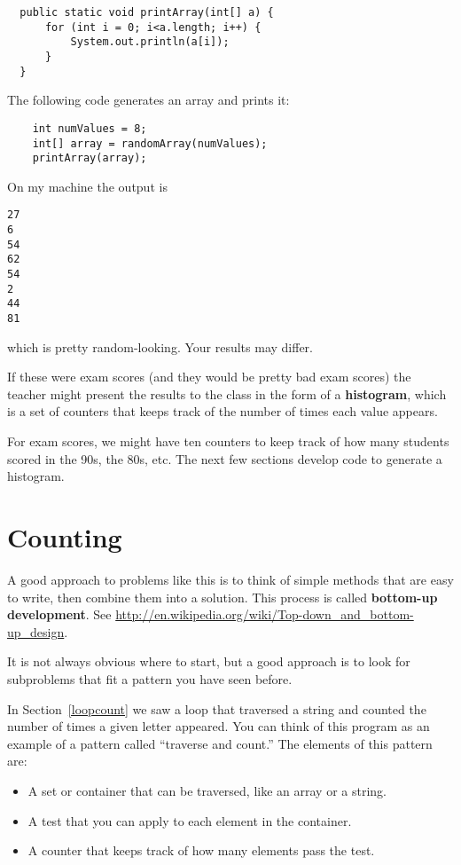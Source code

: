 \documentclass[12pt]{book}
\theoremstyle{definition}
\begin{document}
\begin{lstlisting}
  public static void printArray(int[] a) {
      for (int i = 0; i<a.length; i++) {
          System.out.println(a[i]);
      }
  }
\end{lstlisting}
%
The following code generates an array and prints it:

\begin{lstlisting}
    int numValues = 8;
    int[] array = randomArray(numValues);
    printArray(array);
\end{lstlisting}
%
On my machine the output is

\begin{lstlisting}
27
6
54
62
54
2
44
81
\end{lstlisting}
%
which is pretty random-looking.  Your results may differ.

If these were exam scores (and they would be pretty bad exam
scores) the teacher might present the results to the class
in the form of a {\bf histogram}, which is a set of counters
that keeps track of the number of times each value appears.


For exam scores, we might have ten counters to keep track of
how many students scored in the 90s, the 80s, etc.  The next
few sections develop code to generate a histogram.


\section{Counting}

A good approach to problems like this is to think of simple methods
that are easy to write, then combine them into a solution.
This process is called {\bf bottom-up development}.
See \url{http://en.wikipedia.org/wiki/Top-down_and_bottom-up_design}.

It is not always obvious where to start,
but a good approach is to look for subproblems that fit a pattern you
have seen before.

In Section~\ref{loopcount} we saw a loop that traversed a
string and counted the number of times a given letter appeared.  You
can think of this program as an example of a pattern called ``traverse
and count.''  The elements of this pattern are:

\begin{itemize}

\item A set or container that can be traversed, like an array
or a string.

\item A test that you can apply to each element in the container.

\item A counter that keeps track of how many elements pass
the test.

\end{itemize}
\end{document}
